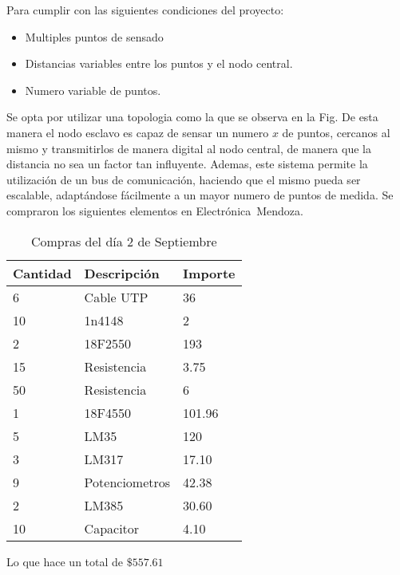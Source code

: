 Para cumplir con las siguientes condiciones del proyecto:
\begin{itemize}
 \item Multiples puntos de sensado
 \item Distancias variables entre los puntos y el nodo central.
 \item Numero variable de puntos.
\end{itemize}
Se opta por utilizar una topologia como la que se observa en la Fig.
De esta manera el nodo esclavo es capaz de sensar un numero $x$ de puntos, cercanos al mismo
y transmitirlos de manera digital al nodo central, de manera que la distancia no sea un factor 
tan influyente. Ademas, este sistema permite la utilización de un bus de comunicación, haciendo 
que el mismo pueda ser escalable, adaptándose fácilmente a un mayor numero de
puntos de medida.
Se compraron los siguientes elementos en Electrónica~Mendoza.
\begin{table}[H]
  \begin{tabular}{l l l}
    \toprule
    \textbf{Cantidad} & \textbf{Descripción} & \textbf{Importe} \\
    \toprule
    6 	& 	Cable UTP 	& 	36\\
    10  & 	1n4148		& 	2\\
    2	&	18F2550		&	193\\
    15	&	Resistencia	&	3.75\\
    50	&	Resistencia	&	6\\
    1	&	18F4550		&	101.96\\
    5	&	LM35		&	120\\
    3	&	LM317		&	17.10\\
    9	&	Potenciometros	&	42.38\\
    2	&	LM385		&	30.60\\
    10	&	Capacitor	&	4.10\\

    \bottomrule
  \end{tabular}
  \caption{Compras del día 2 de Septiembre}
  \label{tab:compra}
\end{table}
Lo que hace un total de $\$557.61$



